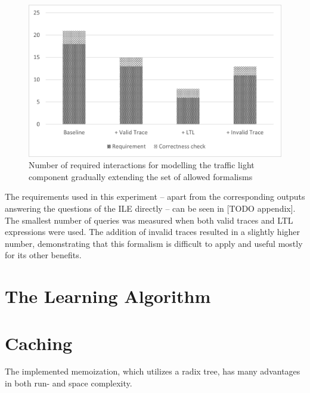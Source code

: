 \begin{figure}[!ht] 
	\centering
	\includegraphics[width=130mm, keepaspectratio]{figures/evaluation_trafficlightformalism.png}
	\caption{Number of required interactions for modelling the traffic light component gradually extending the set of allowed formalisms} 
	\label{fig_eval_trafficlightformalisms}
\end{figure}

The requirements used in this experiment -- apart from the corresponding outputs answering the questions of the ILE directly -- can be seen in [TODO appendix]. The smallest number of queries was measured when both valid traces and LTL expressions were used. The addition of invalid traces resulted in a slightly higher number, demonstrating that this formalism is difficult to apply and useful mostly for its other benefits.  
 
\section{The Learning Algorithm} \label{subs_evallearningalgo}

\section{Caching} \label{subs_evalcaching}

The implemented memoization, which utilizes a radix tree, has many advantages in both run- and space complexity.
